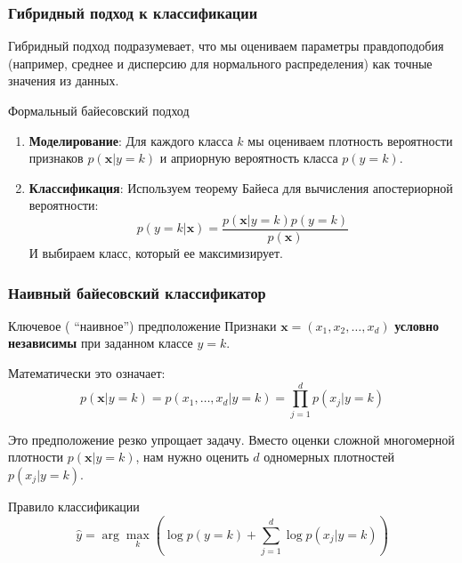 \documentclass[notheorems, handout]{beamer}
\newcommand{\vect}[1]{\mathbf{#1}}
\begin{document}
\begin{frame}
  \frametitle{Гибридный  подход к классификации}
  Гибридный подход подразумевает, что мы оцениваем параметры
  правдоподобия (например, среднее и дисперсию для нормального
  распределения) как точные значения из данных.
  \begin{block}{Формальный байесовский подход }
    \begin{enumerate}
      \item \textbf{Моделирование}: Для каждого класса $k$ мы
        оцениваем плотность вероятности признаков $p(\vect{x}|y=k)$ и
        априорную вероятность класса $p(y=k)$.
      \item \textbf{Классификация}: Используем теорему Байеса для
        вычисления апостериорной вероятности:
        $$ p(y=k|\vect{x}) = \frac{p(\vect{x}|y=k) p(y=k)}{p(\vect{x})} $$
        И выбираем класс, который ее максимизирует.
    \end{enumerate}
  \end{block}
\end{frame}
\begin{frame}
  \frametitle{Наивный байесовский классификатор}
  \begin{block}{Ключевое ( ``наивное'') предположение}
    Признаки $\vect{x} = (x_1, x_2, \dots, x_d)$ \textbf{условно
    независимы} при заданном классе $y=k$.
  \end{block}
  Математически это означает:
  $$ p(\vect{x}|y=k) = p(x_1, \dots, x_d|y=k) = \prod_{j=1}^{d} p(x_j|y=k) $$

  Это предположение резко упрощает задачу. Вместо оценки сложной
  многомерной плотности $p(\vect{x}|y=k)$, нам нужно оценить $d$
  одномерных плотностей $p(x_j|y=k)$.

  \begin{block}{Правило классификации}
    $$ \hat{y} = \arg\max_k \left( \log p(y=k) + \sum_{j=1}^{d} \log
    p(x_j|y=k) \right) $$
  \end{block}
\end{frame}
\end{document}
